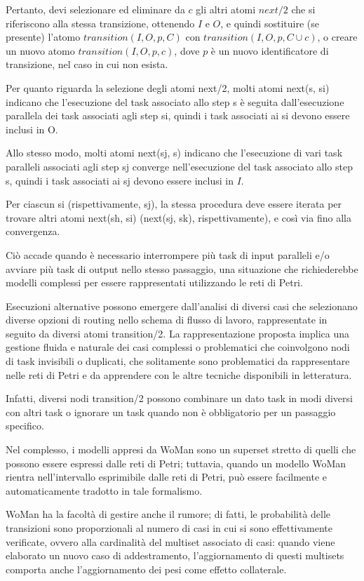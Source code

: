 Pertanto, devi selezionare ed eliminare da $c$ gli altri atomi $next/2$ che si riferiscono alla stessa transizione, ottenendo $I$ e $O$, e quindi sostituire (se presente) l'atomo $transition(I, O, p, C)$ con $transition(I, O, p, C \cup {c})$, o creare un nuovo atomo $transition(I, O, p, {c})$, dove $p$ è un nuovo identificatore di transizione, nel caso in cui non esista.

Per quanto riguarda la selezione degli atomi next/2, molti atomi next(s, si) indicano che l'esecuzione del task associato allo step s è seguita dall'esecuzione parallela dei task associati agli step si, quindi i task associati ai si devono essere inclusi in O. 

Allo stesso modo, molti atomi next(sj, s) indicano che l'esecuzione di vari task paralleli associati agli step sj converge nell'esecuzione del task associato allo step s, quindi i task associati ai sj devono essere inclusi in $I$.

Per ciascun si (rispettivamente, sj), la stessa procedura deve essere iterata per trovare altri atomi next(sh, si) (next(sj, sk), rispettivamente), e così via fino alla convergenza. 

Ciò accade quando è necessario interrompere più task di input paralleli e/o avviare più task di output nello stesso passaggio, una situazione che richiederebbe modelli complessi per essere rappresentati utilizzando le reti di Petri.

Esecuzioni alternative possono emergere dall'analisi di diversi casi che selezionano diverse opzioni di routing nello schema di flusso di lavoro, rappresentate in seguito da diversi atomi transition/2. La rappresentazione proposta implica una gestione fluida e naturale dei casi complessi o problematici che coinvolgono nodi di task invisibili o duplicati, che solitamente sono problematici da rappresentare nelle reti di Petri e da apprendere con le altre tecniche disponibili in letteratura. 

Infatti, diversi nodi transition/2 possono combinare un dato task in modi diversi con altri task o ignorare un task quando non è obbligatorio per un passaggio specifico. 

Nel complesso, i modelli appresi da WoMan sono un superset stretto di quelli che possono essere espressi dalle reti di Petri; tuttavia, quando un modello WoMan rientra nell'intervallo esprimibile dalle reti di Petri, può essere facilmente e automaticamente tradotto in tale formalismo.

WoMan ha la facoltà di gestire anche il rumore; di fatti, le probabilità delle transizioni sono proporzionali al numero di casi in cui si sono effettivamente verificate, ovvero alla cardinalità del multiset associato di casi: quando viene elaborato un nuovo caso di addestramento, l'aggiornamento di questi multisets comporta anche l'aggiornamento dei pesi come effetto collaterale. 


